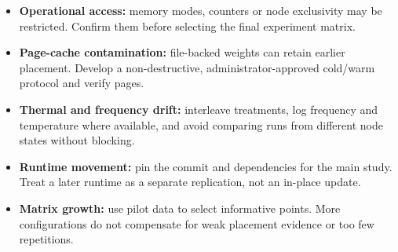 \begin{itemize}
  \item \textbf{Operational access:} memory modes, counters or node
        exclusivity may be restricted.  Confirm them before selecting
        the final experiment matrix.
  \item \textbf{Page-cache contamination:} file-backed weights can
        retain earlier placement.  Develop a non-destructive,
        administrator-approved cold/warm protocol and verify pages.
  \item \textbf{Thermal and frequency drift:} interleave treatments,
        log frequency and temperature where available, and avoid
        comparing runs from different node states without blocking.
  \item \textbf{Runtime movement:} pin the commit and dependencies for
        the main study.  Treat a later runtime as a separate replication,
        not an in-place update.
  \item \textbf{Matrix growth:} use pilot data to select informative
        points.  More configurations do not compensate for weak
        placement evidence or too few repetitions.
\end{itemize}
